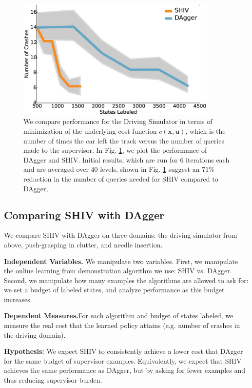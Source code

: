 \documentclass[10pt, conference]{ieeeconf}      %
\newcommand{\bu}{\mathbf{u}}
\newcommand{\bx}{\mathbf{x}}
\begin{document}
\begin{figure}[t!]
\centering
\includegraphics[width=\columnwidth, height=6cm]{figures/dagger_shiv_one_class.eps}
\caption{We compare performance for the Driving Simulator in terms of minimization of the underlying cost function $c(\bx,\bu)$, which is the  number of times the car left the track versus the number of queries made to the supervisor. In Fig. \ref{fig:car_cost}, we plot the performance of DAgger and SHIV.  Initial results, which are run for 6 iterations each and are averaged over 40 levels, shown in Fig. \ref{fig:car_cost} suggest an $71\%$ reduction in the number of queries needed for SHIV compared to DAgger,}
\vspace*{-10pt}
\label{fig:car_cost}
\end{figure}

\subsection{Comparing SHIV with DAgger}
We compare SHIV with DAgger on three domains: the driving simulator from above, push-grasping in clutter, and needle insertion.

\noindent\textbf{Independent Variables.} We manipulate two variables. First, we manipulate the online learning from demonstration algorithm we use: SHIV vs. DAgger. Second, we manipulate how many examples the algorithms are allowed to ask for: we set a budget of labeled states, and analyze performance as this budget increases.

\noindent\textbf{Dependent Measures.}For each algorithm and budget of states labeled, we measure the real cost that the learned policy attains (e.g. number of crashes in the driving domain).


\noindent\textbf{Hypothesis: } We expect SHIV to consistently achieve a lower cost that DAgger for the same budget of supervisor examples. Equivalently, we expect that SHIV achieves the same performance as DAgger, but by asking for fewer examples and thus reducing supervisor burden.
\end{document}
